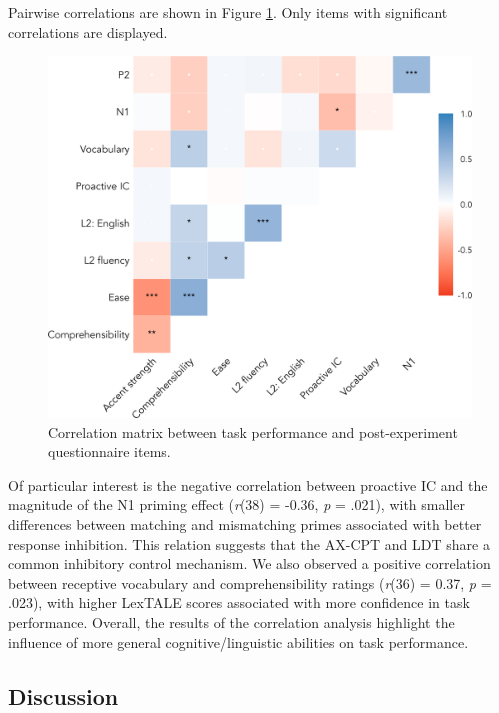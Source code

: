 \documentclass[
  12pt,
  twoside]{article}
\begin{document}
Pairwise correlations are shown in Figure \ref{fig:erp-corr-fig}.
Only items with significant correlations are displayed.

\begin{figure}[H]

{\centering \includegraphics[width=\textwidth]{sections/code/outputs/corr_plot_2} 

}

\caption{Correlation matrix between task performance and post-experiment questionnaire items.}\label{fig:erp-corr-fig}
\end{figure}

Of particular interest is the negative correlation between proactive IC and the magnitude of the N1 priming effect (\emph{r}(38) = -0.36, \emph{p} = .021), with smaller differences between matching and mismatching primes associated with better response inhibition.
This relation suggests that the AX-CPT and LDT share a common inhibitory control mechanism.
We also observed a positive correlation between receptive vocabulary and comprehensibility ratings (\emph{r}(36) = 0.37, \emph{p} = .023), with higher LexTALE scores associated with more confidence in task performance.
Overall, the results of the correlation analysis highlight the influence of more general cognitive/linguistic abilities on task performance.

\hypertarget{discussion-3}{%
\subsection{Discussion}\label{discussion-3}}
\end{document}

